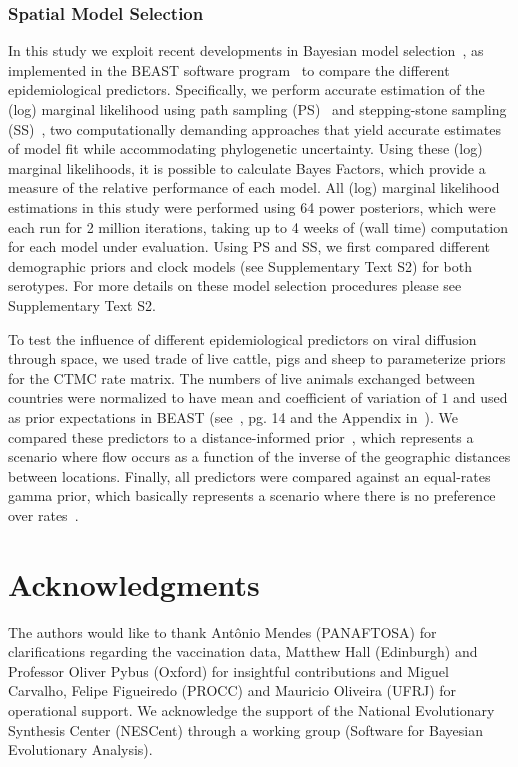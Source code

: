 \documentclass[10pt]{article}
\begin{document}
\subsubsection*{Spatial Model Selection}

In this study we exploit recent developments in Bayesian model selection~\cite{Baele2012, Baele2013a, Baele2013b, Baele2013c}, as implemented in the BEAST software program~\cite{beast2012} to compare the different epidemiological predictors.
Specifically, we perform accurate estimation of the (log) marginal likelihood using path sampling (PS)~\cite{LartillotPhilippe} and stepping-stone sampling (SS)~\cite{Xie}, two computationally demanding approaches that yield accurate estimates of model fit while accommodating phylogenetic uncertainty.
Using these (log) marginal likelihoods, it is possible to calculate Bayes Factors, which provide a measure of the relative performance of each model. 
All (log) marginal likelihood estimations in this study were performed using 64 power posteriors, which were each run for 2 million iterations, taking up to 4 weeks of (wall time) computation for each model under evaluation. 
Using PS and SS, we first compared different demographic priors and clock models (see Supplementary Text S2) for both serotypes. 
For more details on these model selection procedures please see Supplementary Text S2.

To test the influence of different epidemiological predictors on viral diffusion through space, we used trade of live cattle, pigs and sheep to parameterize priors for the CTMC rate matrix.
The numbers of live animals exchanged between countries were normalized to have mean and coefficient of variation of $1$ and used as prior expectations in BEAST (see~\cite{roots}, pg. 14 and the Appendix in~\cite{Carvalho2013}).  
We compared these predictors to a distance-informed prior~\cite{roots}, which represents a scenario where flow occurs as a function of the inverse of the geographic distances between locations.
Finally, all predictors were compared against an equal-rates gamma prior, which basically represents a scenario where there is no preference over rates~\cite{Nelson2011}.

\section*{Acknowledgments}
The authors would like to thank Ant\^onio Mendes (PANAFTOSA) for clarifications regarding the vaccination data, Matthew Hall (Edinburgh) and Professor Oliver Pybus (Oxford) for insightful contributions and Miguel Carvalho, Felipe Figueiredo (PROCC) and Mauricio Oliveira (UFRJ) for operational support.
We acknowledge the support of the National Evolutionary Synthesis Center (NESCent) through a working group (Software for Bayesian Evolutionary Analysis).
\end{document}
